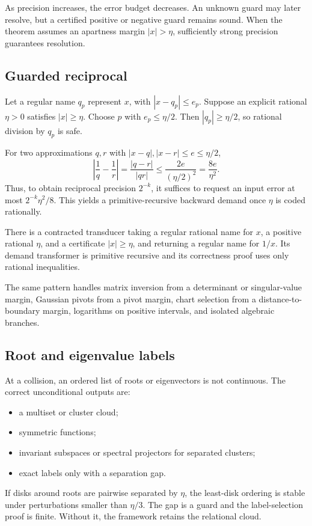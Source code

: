 As precision increases, the error budget decreases.  An unknown guard may
later resolve, but a certified positive or negative guard remains sound.  When
the theorem assumes an apartness margin \(|x|>\eta\), sufficiently strong
precision guarantees resolution.

\subsection{Guarded reciprocal}

Let a regular name \(q_p\) represent \(x\), with
\(|x-q_p|\le e_p\).  Suppose an explicit rational \(\eta>0\) satisfies
\(|x|\ge\eta\).  Choose \(p\) with \(e_p\le\eta/2\).  Then
\(|q_p|\ge\eta/2\), so rational division by \(q_p\) is safe.

For two approximations \(q,r\) with
\(|x-q|,|x-r|\le e\le\eta/2\),
\[
 \left|\frac1q-\frac1r\right|
 =\frac{|q-r|}{|qr|}
 \le \frac{2e}{(\eta/2)^2}
 =\frac{8e}{\eta^2}.
\]
Thus, to obtain reciprocal precision \(2^{-k}\), it suffices to request an
input error at most \(2^{-k}\eta^2/8\).  This yields a primitive-recursive
backward demand once \(\eta\) is coded rationally.

\begin{theorem}
There is a contracted transducer taking a regular rational name for \(x\), a
positive rational \(\eta\), and a certificate \(|x|\ge\eta\), and returning a
regular name for \(1/x\).  Its demand transformer is primitive recursive and
its correctness proof uses only rational inequalities.
\end{theorem}

The same pattern handles matrix inversion from a determinant or singular-value
margin, Gaussian pivots from a pivot margin, chart selection from a distance-to-
boundary margin, logarithms on positive intervals, and isolated algebraic
branches.

\subsection{Root and eigenvalue labels}

At a collision, an ordered list of roots or eigenvectors is not continuous.
The correct unconditional outputs are:
\begin{itemize}
\item a multiset or cluster cloud;
\item symmetric functions;
\item invariant subspaces or spectral projectors for separated clusters;
\item exact labels only with a separation gap.
\end{itemize}
If disks around roots are pairwise separated by \(\eta\), the least-disk
ordering is stable under perturbations smaller than \(\eta/3\).  The gap is a
guard and the label-selection proof is finite.  Without it, the framework
retains the relational cloud.

